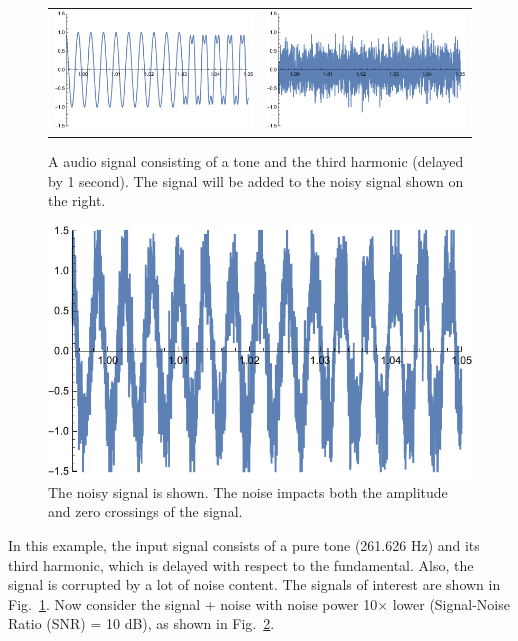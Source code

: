 \begin{figure}[tb]
\begin{center}
\begin{tabular}{cc}
\includegraphics[width=.45\columnwidth]{tonesintime.pdf} &
\includegraphics[width=.45\columnwidth]{noiseonly.pdf} \\
\end{tabular}
\end{center}
\caption{A audio signal consisting of a tone and the third harmonic (delayed by 1 second).  The signal will be added to the noisy signal shown on the right.} \label{fig:tones_time}
\end{figure}


\begin{figure}[tb]
\begin{center}
\includegraphics[width=.45\columnwidth]{signoise.pdf}
\end{center}
\caption{The noisy signal is shown.  The noise impacts both the amplitude and zero crossings of the signal.} \label{fig:sigplusnoise}
\end{figure}


In this example, the input signal consists of a pure tone (261.626 Hz) and its third harmonic, which is delayed with respect to the fundamental.  Also, the signal is corrupted by a lot of noise content.  The signals of interest are shown in Fig.~\ref{fig:tones_time}.   Now consider the signal + noise with noise power 10$\times$ lower (Signal-Noise Ratio (SNR) = 10 dB), as shown in Fig.~\ref{fig:sigplusnoise}.
	
